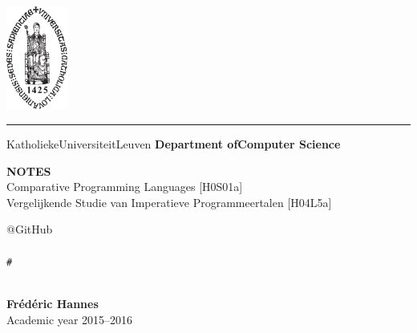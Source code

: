 \documentclass[a4paper]{article}
\begin{document}
\begin{titlepage}
    \newpage
    \thispagestyle{empty}
    \frenchspacing
    \hspace{-0.2cm}
    \includegraphics[height=3.4cm]{assets/sedes}
    \hspace{0.2cm}
    \rule{0.5pt}{3.4cm}
    \hspace{0.2cm}
    \begin{minipage}[b]{8cm}
        \Large{Katholieke\newline Universiteit\newline Leuven}\smallskip\newline
        \large{}\smallskip\newline
        \textbf{Department of\newline Computer Science}\smallskip
    \end{minipage}
    \vspace*{3.2cm}\vfill
    \begin{center}
        \begin{minipage}[t]{\textwidth}
            \begin{center}
                \large{\rm{\textbf{\uppercase{Notes}}}}\\
                \large{\rm{Comparative Programming Languages [H0S01a]}}\\
                \large{\rm{Vergelijkende Studie van Imperatieve Programmeertalen [H04L5a]}}
            \end{center}
        \end{minipage}
    \end{center}
    \vfill\vspace*{5cm}
    \begin{minipage}[t]{0.2\textwidth}
        \begin{center}
            @GitHub\\
            \\
            {\tt \#}
        \end{center}
    \end{minipage}\hfill
    \begin{minipage}[t]{0.3\textwidth}
        \vfill\noindent \\[5mm]
        {\rm \textbf{Fr\'ed\'eric Hannes}}\\[2mm]
        {\rm Academic year 2015--2016}
    \end{minipage}
\end{titlepage}
\end{document}
